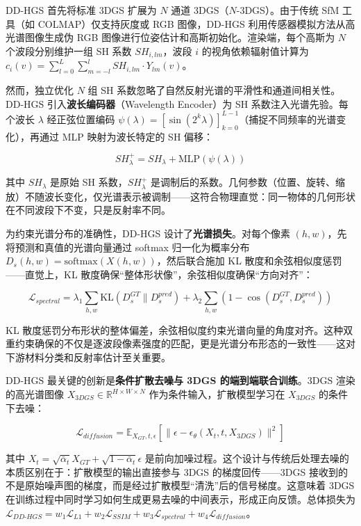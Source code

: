 DD-HGS 首先将标准 3DGS 扩展为 $N$ 通道 3DGS（$N$-3DGS）。由于传统 SfM 工具（如 COLMAP）仅支持灰度或 RGB 图像，DD-HGS 利用传感器模拟方法从高光谱图像生成伪 RGB 图像进行位姿估计和高斯初始化。渲染端，每个高斯为 $N$ 个波段分别维护一组 SH 系数 $SH_{i,lm}$，波段 $i$ 的视角依赖辐射值计算为 $c_i(v) = \sum_{l=0}^{L}\sum_{m=-l}^{l} SH_{i,lm} \cdot Y_{lm}(v)$。

然而，独立优化 $N$ 组 SH 系数忽略了自然反射光谱的平滑性和通道间相关性。DD-HGS 引入\textbf{波长编码器}（Wavelength Encoder）为 SH 系数注入光谱先验。每个波长 $\lambda$ 经正弦位置编码 $\psi(\lambda) = [\sin(2^k \lambda)]_{k=0}^{L-1}$（捕捉不同频率的光谱变化），再通过 MLP 映射为波长特定的 SH 偏移：

\begin{equation}
SH_{\lambda}^{+} = SH_{\lambda} + \text{MLP}(\psi(\lambda))
\end{equation}

其中 $SH_{\lambda}$ 是原始 SH 系数，$SH_{\lambda}^{+}$ 是调制后的系数。几何参数（位置、旋转、缩放）不随波长变化，仅光谱表示被调制——这符合物理直觉：同一物体的几何形状在不同波段下不变，只是反射率不同。

为约束光谱分布的准确性，DD-HGS 设计了\textbf{光谱损失}。对每个像素 $(h,w)$，先将预测和真值的光谱向量通过 softmax 归一化为概率分布 $D_s(h,w) = \text{softmax}(X(h,w))$，然后联合施加 KL 散度和余弦相似度惩罚——直觉上，KL 散度确保“整体形状像”，余弦相似度确保“方向对齐”：

\begin{equation}
\mathcal{L}_{spectral} = \lambda_1 \sum_{h,w} \text{KL}(D_s^{GT} \| D_s^{pred}) + \lambda_2 \sum_{h,w} (1 - \cos(D_s^{GT}, D_s^{pred}))
\end{equation}

KL 散度惩罚分布形状的整体偏差，余弦相似度约束光谱向量的角度对齐。这种双重约束确保的不仅是逐波段像素强度的匹配，更是光谱分布形态的一致性——这对下游材料分类和反射率估计至关重要。

DD-HGS 最关键的创新是\textbf{条件扩散去噪与 3DGS 的端到端联合训练}。3DGS 渲染的高光谱图像 $X_{3DGS} \in \mathbb{R}^{H \times W \times N}$ 作为条件输入，扩散模型学习在 $X_{3DGS}$ 的条件下去噪：

\begin{equation}
\mathcal{L}_{diffusion} = \mathbb{E}_{X_{GT}, t, \epsilon} \left[\|\epsilon - \epsilon_\theta(X_t, t, X_{3DGS})\|^2\right]
\end{equation}

其中 $X_t = \sqrt{\bar{\alpha}_t} X_{GT} + \sqrt{1-\bar{\alpha}_t}\epsilon$ 是前向加噪过程。这个设计与传统后处理去噪的本质区别在于：扩散模型的输出直接参与 3DGS 的梯度回传——3DGS 接收到的不是原始噪声图的梯度，而是经过扩散模型“清洗”后的信号梯度。这意味着 3DGS 在训练过程中同时学习如何生成更易去噪的中间表示，形成正向反馈。总体损失为 $\mathcal{L}_{DD\text{-}HGS} = w_1 \mathcal{L}_{L1} + w_2 \mathcal{L}_{SSIM} + w_3 \mathcal{L}_{spectral} + w_4 \mathcal{L}_{diffusion}$。

